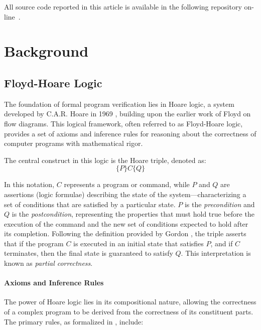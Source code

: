 \documentclass[sigconf]{acmart}
\begin{document}
All source code reported in this article is available in the following repository on-line~\cite{repo}.

\section{Background}\label{sec:background} %

\subsection{Floyd-Hoare Logic}

The foundation of formal program verification lies in Hoare logic, a system developed by C.A.R. Hoare in 1969 \cite{hoare1969axiomatic}, building upon the earlier work of Floyd \cite{floyd1967assigning} on flow diagrams. This logical framework, often referred to as Floyd-Hoare logic, provides a set of axioms and inference rules for reasoning about the correctness of computer programs with mathematical rigor.

The central construct in this logic is the Hoare triple, denoted as:
\[
\{P\} C \{Q\}
\]

In this notation, $C$ represents a program or command, while $P$ and $Q$ are assertions (logic formulae) describing the state of the system—characterizing a set of conditions that are satisfied by a particular state. $P$ is the \textit{precondition} and $Q$ is the \textit{postcondition}, representing the properties that must hold true before the execution of the command and the new set of conditions expected to hold after its completion. Following the definition provided by Gordon \cite{gordon2014hoare}, the triple asserts that if the program $C$ is executed in an initial state that satisfies $P$, and if $C$ terminates, then the final state is guaranteed to satisfy $Q$. This interpretation is known as \textit{partial correctness}.

\paragraph{Axioms and Inference Rules}
The power of Hoare logic lies in its compositional nature, allowing the correctness of a complex program to be derived from the correctness of its constituent parts. The primary rules, as formalized in \cite{gordon2014hoare}, include:
\end{document}
